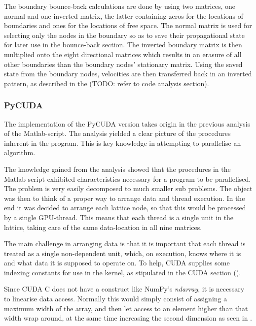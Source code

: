 
The boundary bounce-back calculations are done by using two matrices, one normal and one inverted matrix, the latter containing zeros for the locations of boundaries and ones for the locations of free space. The normal matrix is used for selecting only the nodes in the boundary so as to save their propagational state for later use in the bounce-back section. The inverted boundary matrix is then multiplied onto the eight directional matrices which results in an erasure of all other boundaries than the boundary nodes' stationary matrix. Using the saved state from the boundary nodes, velocities are then transferred back in an inverted pattern, as described in the (TODO: refer to code analysis section).



\subsubsection{PyCUDA}
The implementation of the PyCUDA version takes origin in the previous analysis of the Matlab-script. The analysis yielded a clear picture of the procedures inherent in the program. This is key knowledge in attempting to parallelise an algorithm.

The knowledge gained from the analysis showed that the procedures in the Matlab-script exhibited characteristics necessary for a program to be parallelised. The problem is very easily decomposed to much smaller sub problems. The object was then to think of a proper way to arrange data and thread execution. In the end it was decided to arrange each lattice node, so that this would be processed by a single GPU-thread. This means that each thread is a single unit in the lattice, taking care of the same data-location in all nine matrices.

The main challenge in arranging data is that it is important that each thread is treated as a single non-dependent unit, which, on execution, knows where it is and what data it is supposed to operate on. To help, CUDA supplies some indexing constants for use in the kernel, as stipulated in the CUDA section ().

Since CUDA C does not have a construct like NumPy's \textit{ndarray}, it is necessary to linearise data access. Normally this would simply consist of assigning a maximum width of the array, and then let access to an element higher than that width wrap around, at the same time increasing the second dimension as seen in .

